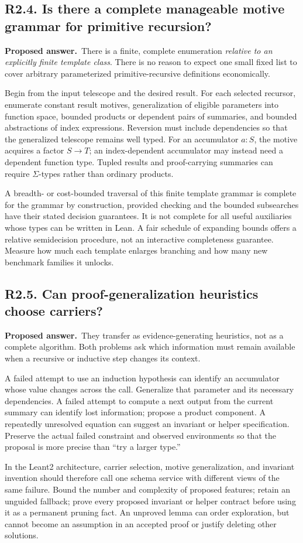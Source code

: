 \documentclass[11pt,a4paper]{article}
\newcommand{\question}[2]{\subsection{#1. #2}\label{q:#1}}
\newcommand{\answer}{\textbf{Proposed answer.}\ }
\theoremstyle{remark}
\begin{document}
\question{R2.4}{Is there a complete manageable motive grammar for primitive recursion?}

\answer There is a finite, complete enumeration \emph{relative to an explicitly
finite template class}. There is no reason to expect one small fixed list to
cover arbitrary parameterized primitive-recursive definitions economically.

Begin from the input telescope and the desired result. For each selected
recursor, enumerate constant result motives, generalization of eligible
parameters into function space, bounded products or dependent pairs of
summaries, and bounded abstractions of index expressions. Reversion must
include dependencies so that the generalized telescope remains well typed.
For an accumulator $a:S$, the motive acquires a factor $S\to T$; an
index-dependent accumulator may instead need a dependent function type.
Tupled results and proof-carrying summaries can require $\Sigma$-types rather
than ordinary products.

A breadth- or cost-bounded traversal of this finite template grammar is
complete for the grammar by construction, provided checking and the bounded
subsearches have their stated decision guarantees. It is not complete for
all useful auxiliaries whose types can be written in Lean. A fair schedule
of expanding bounds offers a relative semidecision procedure, not an
interactive completeness guarantee. Measure how much each template enlarges
branching and how many new benchmark families it unlocks.

\question{R2.5}{Can proof-generalization heuristics choose carriers?}

\answer They transfer as evidence-generating heuristics, not as a complete
algorithm. Both problems ask which information must remain available when a
recursive or inductive step changes its context.

A failed attempt to use an induction hypothesis can identify an accumulator
whose value changes across the call. Generalize that parameter and its
necessary dependencies. A failed attempt to compute a next output from the
current summary can identify lost information; propose a product component.
A repeatedly unresolved equation can suggest an invariant or helper
specification. Preserve the actual failed constraint and observed environments
so that the proposal is more precise than ``try a larger type.''

In the Leant2 architecture, carrier selection, motive generalization, and
invariant invention should therefore call one schema service with different
views of the same failure. Bound the number and complexity of proposed
features; retain an unguided fallback; prove every proposed invariant or
helper contract before using it as a permanent pruning fact. An unproved
lemma can order exploration, but cannot become an assumption in an accepted
proof or justify deleting other solutions.
\end{document}
